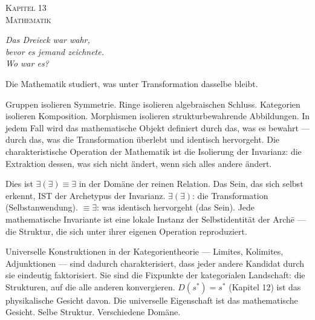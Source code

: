 \documentclass[10pt, openany, oneside]{book}
\renewcommand{\large}{\fontsize{11.5}{14}\selectfont}
\renewcommand{\huge}{\fontsize{17}{21}\selectfont}
\begin{document}
%
%
%
%

\newpage

\begin{center}
    {\huge\scshape Kapitel 13}\\[0.3em]
    {\large\scshape Mathematik}
\end{center}

\vspace{1.5em}

\begin{center}
    \itshape
    Das Dreieck war wahr,\\
    bevor es jemand zeichnete.\\
    Wo war es?
\end{center}

\vspace{2em}


\noindent Die Mathematik studiert, was unter Transformation dasselbe bleibt.

Gruppen isolieren Symmetrie. Ringe isolieren algebraischen Schluss. Kategorien isolieren Komposition. Morphismen isolieren strukturbewahrende Abbildungen. In jedem Fall wird das mathematische Objekt definiert durch das, was es bewahrt --- durch das, was die Transformation überlebt und identisch hervorgeht. Die charakteristische Operation der Mathematik ist die Isolierung der Invarianz: die Extraktion dessen, was sich nicht ändert, wenn sich alles andere ändert.

Dies ist $\exists(\exists) \equiv \exists$ in der Domäne der reinen Relation. Das Sein, das sich selbst erkennt, IST der Archetypus der Invarianz. $\exists(\exists)$: die Transformation (Selbstanwendung). $\equiv \exists$: was identisch hervorgeht (das Sein). Jede mathematische Invariante ist eine lokale Instanz der Selbstidentität der Arch\={e} --- die Struktur, die sich unter ihrer eigenen Operation reproduziert.

Universelle Konstruktionen in der Kategorientheorie --- Limites, Kolimites, Adjunktionen --- sind dadurch charakterisiert, dass jeder andere Kandidat durch sie eindeutig faktorisiert. Sie sind die Fixpunkte der kategorialen Landschaft: die Strukturen, auf die alle anderen konvergieren. $D(s^*) = s^*$ (Kapitel 12) ist das physikalische Gesicht davon. Die universelle Eigenschaft ist das mathematische Gesicht. Selbe Struktur. Verschiedene Domäne.
\end{document}
